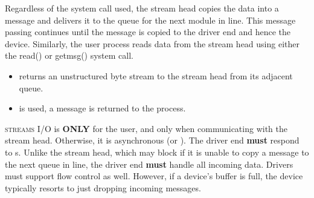 Regardless of the system call used, the stream head copies the data into a message and delivers it to the queue for the next module in line.
This message passing continues until the message is copied to the driver end and hence the device.
Similarly, the user process reads data from the stream head using either the read() or getmsg() system call.
\begin{itemize}[noitemsep]
\item {} returns an unstructured byte stream to the stream head from its adjacent queue.
\item {} is used, a message is returned to the process.
\end{itemize}

\textsc{streams} I/O is  \textbf{ONLY} for the user, and only when communicating with the stream head.
Otherwise, it is asynchronous (or ).
The driver end \textbf{must} respond to s.
Unlike the stream head, which may block if it is unable to copy a message to the next queue in line, the driver end \textbf{must} handle all incoming data.
Drivers must support flow control as well.
However, if a device’s buffer is full, the device typically resorts to just dropping incoming messages.


